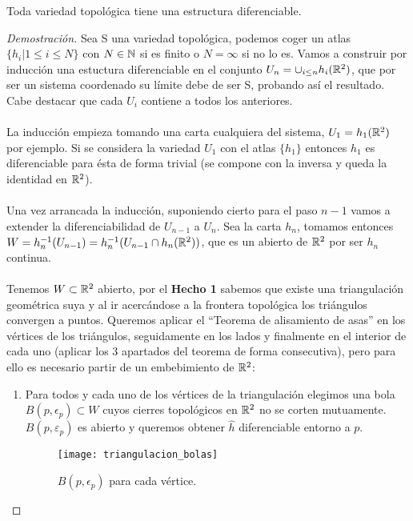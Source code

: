 	\begin{teora}
		Toda variedad topológica tiene una estructura diferenciable.
	\end{teora}
	\begin{proof}[Demostración]
		Sea S una variedad topológica, podemos coger un atlas $\{h_i | 1\leq i\leq N\}$ con $N \in \mathbb{N}$ si es finito o $N = \infty$ si no lo es. Vamos a construir por inducción una estuctura diferenciable en el conjunto $U_n = \cup_{i\leq n}h_i(\mathbb{R}^2)$, que por ser un sistema coordenado su límite debe de ser S, probando así el resultado. Cabe destacar que cada $U_i$ contiene a todos los anteriores. \\
		\\ La inducción empieza tomando una carta cualquiera del sistema, $U_1=h_1(\mathbb{R}^2)$ por ejemplo. Si se considera la variedad $U_1$ con el atlas $\{h_1\}$ entonces $h_1$ es diferenciable para ésta de forma trivial (se compone con la inversa y queda la identidad en $\mathbb{R}^2$).\\
		\\ Una vez arrancada la inducción, suponiendo cierto para el paso $n-1$ vamos a extender la diferenciabilidad de $U_{n-1}$ a $U_n$. Sea la carta $h_n$, tomamos entonces $W=h_n^{-1}(U_{n-1})=h_n^{-1}(U_{n-1}\cap h_n(\mathbb{R}^2))$, que es un abierto de $\mathbb{R}^2$ por ser $h_n$ continua. \\
		\\ Tenemos $W\subset \mathbb{R}^2$ abierto, por el \textbf{Hecho 1} sabemos que existe una triangulación geométrica suya y al ir acercándose a la frontera topológica los triángulos convergen a puntos. Queremos aplicar el ``Teorema de alisamiento de asas'' en los vértices de los triángulos, seguidamente en los lados y finalmente en el interior de cada uno (aplicar los 3 apartados del teorema de forma consecutiva), pero para ello es necesario partir de un embebimiento de $\mathbb{R}^2$:
		\begin{enumerate}
			\item Para todos y cada uno de los vértices de la triangulación elegimos una bola $B(p, \epsilon_p) \subset W$ cuyos cierres topológicos en $\mathbb{R}^2$ no se corten mutuamente. $B(p,\varepsilon _p)$ es abierto y queremos obtener $\widehat{h}$ diferenciable entorno a $p$. \\
			\newpage
			\begin{figure}[h]
  				\centering
  				\texttt{[image: triangulacion\_bolas]}
  				\caption{$B(p, \epsilon_p)$ para cada vértice.}
  				\label{fig:triangulacion_bolas}
			\end{figure}

\end{enumerate}
\end{proof}
